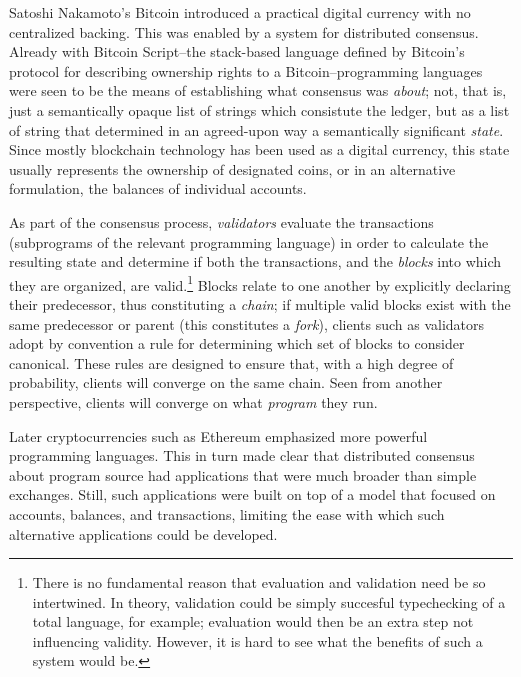 Satoshi Nakamoto's Bitcoin introduced a practical digital currency with no
centralized backing.\cite{Nakamoto2008} This was enabled by a system for
distributed consensus. Already with Bitcoin Script--the stack-based language
defined by Bitcoin's protocol for describing ownership rights to a
Bitcoin--programming languages were seen to be the means of establishing what
consensus was \textit{about}; not, that is, just a semantically opaque list of
strings which consistute the ledger, but as a list of string that determined in
an agreed-upon way a semantically significant \textit{state}. Since mostly
blockchain technology has been used as a digital currency, this state usually
represents the ownership of designated coins, or in an alternative formulation,
the balances of individual accounts.

As part of the consensus process, \textit{validators} evaluate the transactions
(subprograms of the relevant programming language) in order to calculate the
resulting state and determine if both the transactions, and the \textit{blocks}
into which they are organized, are valid.\footnote{There is no fundamental
reason that evaluation and validation need be so intertwined. In theory,
validation could be simply succesful typechecking of a total language, for
example; evaluation would then be an extra step not influencing validity.
However, it is hard to see what the benefits of such a system would be.} Blocks
relate to one another by explicitly declaring their predecessor, thus
constituting a \textit{chain}; if
multiple valid blocks exist with the same predecessor or parent (this constitutes a
\textit{fork}), clients such as validators adopt by convention a rule for
determining which set of blocks to consider canonical. These rules are designed
to ensure that, with a high degree of probability, clients will converge on the
same chain. Seen from another perspective, clients will
converge on what \textit{program} they run.


Later cryptocurrencies such as Ethereum emphasized more powerful programming
languages. This in turn made clear that distributed consensus about program
source had applications that were much broader than simple exchanges. Still,
such applications were built on top of a model that focused on accounts,
balances, and transactions, limiting the ease with which such alternative
applications could be developed.



